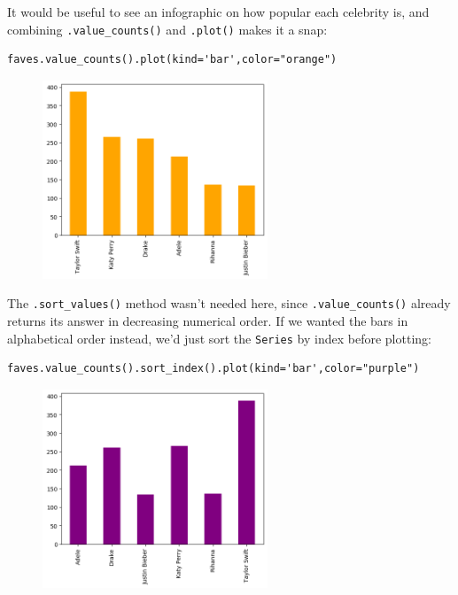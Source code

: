 
It would be useful to see an infographic on how popular each celebrity is, and
combining \texttt{.value\_counts()} and \texttt{.plot()} makes it a snap:

\begin{Verbatim}[fontsize=\small,samepage=true,frame=single,framesep=3mm]
faves.value_counts().plot(kind='bar',color="orange")
\end{Verbatim}

\begin{figure}[ht]
\centering
\includegraphics[width=0.6\textwidth]{celebs.png}
\end{figure}


The \texttt{.sort\_values()} method wasn't needed here, since
\texttt{.value\_counts()} already returns its answer in decreasing numerical
order. If we wanted the bars in alphabetical order instead, we'd just sort the
\texttt{Series} by index before plotting:

\begin{Verbatim}[fontsize=\small,samepage=true,frame=single,framesep=3mm]
faves.value_counts().sort_index().plot(kind='bar',color="purple")
\end{Verbatim}

\begin{figure}[ht]
\centering
\includegraphics[width=0.6\textwidth]{celebs2.png}
\end{figure}

